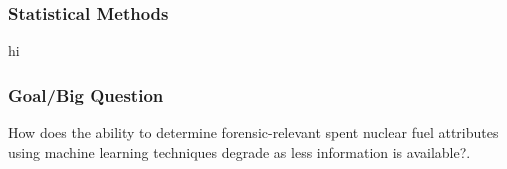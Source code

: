 \begin{frame}
  \frametitle{Statistical Methods}
  hi
\end{frame}

\begin{frame}
  \frametitle{Goal/Big Question}
  How does the ability to determine forensic-relevant spent nuclear fuel
  attributes using machine learning techniques degrade as less information is
  available?.
\end{frame}
